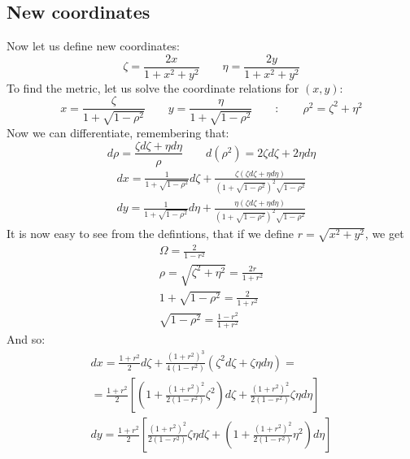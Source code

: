 \documentclass{article}
\begin{document}
\subsection{New coordinates}
Now let us define new coordinates:
\begin{equation}
    \zeta = \frac{2x}{1 + x^2 + y^2} \qquad \eta = \frac{2y}{1 + x^2 + y^2}
\end{equation}
To find the metric, let us solve the coordinate relations for $(x,y)$:
\begin{equation}
    x = \frac{\zeta}{1 + \sqrt{1 - \rho^2}} \qquad y = \frac{\eta}{1 + \sqrt{1 - \rho^2}} \qquad : \qquad \rho^2 = \zeta^2 + \eta^2
\end{equation}
Now we can differentiate, remembering that:
\begin{equation}
    d\rho = \frac{\zeta d\zeta + \eta d\eta}{\rho} \qquad d(\rho^2) = 2\zeta d\zeta + 2\eta d\eta
\end{equation}
\begin{equation}
\begin{gathered}
    dx = \frac{1}{1 + \sqrt{1 - \rho^2}}d\zeta + \frac{\zeta(\zeta d\zeta + \eta d\eta)}{(1 + \sqrt{1 - \rho^2})^2\sqrt{1 - \rho^2}}
    \\
    dy = \frac{1}{1 + \sqrt{1 - \rho^2}}d\eta + \frac{\eta(\zeta d\zeta + \eta d\eta)}{(1 + \sqrt{1 - \rho^2})^2\sqrt{1 - \rho^2}}
\end{gathered}
\end{equation}
It is now easy to see from the defintions, that if we define $r = \sqrt{x^2+y^2}$, we get
\begin{equation}
\begin{gathered}
    \Omega = \frac{2}{1-r^2} \\
    \rho = \sqrt{\zeta^2 + \eta^2} = \frac{2r}{1+r^2} \\
    1+\sqrt{1-\rho^2} = \frac{2}{1+r^2} \\
    \sqrt{1-\rho^2} = \frac{1-r^2}{1+r^2}
\end{gathered}
\end{equation}
And so:
\begin{equation}
\begin{gathered}
    dx = \frac{1+r^2}{2}d\zeta + \frac{(1+r^2)^3}{4(1-r^2)}(\zeta^2 d\zeta + \zeta\eta d\eta) = \\ = \frac{1+r^2}{2}\left[\left(1 + \frac{(1+r^2)^2}{2(1-r^2)}\zeta^2\right)d\zeta + \frac{(1+r^2)^2}{2(1-r^2)}\zeta\eta d\eta\right]
    \\
    dy = \frac{1+r^2}{2}\left[\frac{(1+r^2)^2}{2(1-r^2)}\zeta\eta d\zeta + \left(1 + \frac{(1+r^2)^2}{2(1-r^2)}\eta^2\right)d\eta\right]
\end{gathered}
\end{equation}
\end{document}
